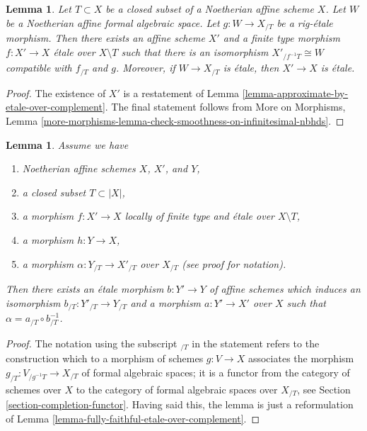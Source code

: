 \documentclass{stacks-project}
\theoremstyle{plain}
\newtheorem{lemma}[subsection]{Lemma}
\theoremstyle{definition}
\theoremstyle{remark}
\numberwithin{equation}{subsection}
\begin{document}
\begin{lemma}
\label{lemma-algebraize-rig-etale-affine}
Let $T \subset X$ be a closed subset of a Noetherian affine scheme $X$.
Let $W$ be a Noetherian affine formal algebraic space.
Let $g : W \to X_{/T}$ be a rig-\'etale morphism. Then there exists
an affine scheme $X'$ and a finite type morphism $f : X' \to X$
\'etale over $X \setminus T$ such that there is an isomorphism
$X'_{/f^{-1}T} \cong W$ compatible with $f_{/T}$ and $g$.
Moreover, if $W \to X_{/T}$ is \'etale, then $X' \to X$ is \'etale.
\end{lemma}

\begin{proof}
The existence of $X'$ is a restatement of
Lemma \ref{lemma-approximate-by-etale-over-complement}.
The final statement follows from
More on Morphisms, Lemma
\ref{more-morphisms-lemma-check-smoothness-on-infinitesimal-nbhds}.
\end{proof}

\begin{lemma}
\label{lemma-algebraize-morphism-rig-etale}
Assume we have
\begin{enumerate}
\item Noetherian affine schemes $X$, $X'$, and $Y$,
\item a closed subset $T \subset |X|$,
\item a morphism $f : X' \to X$ locally of finite type
and \'etale over $X \setminus T$,
\item a morphism $h : Y \to X$,
\item a morphism $\alpha : Y_{/T} \to X'_{/T}$ over $X_{/T}$
(see proof for notation).
\end{enumerate}
Then there exists an \'etale morphism $b : Y' \to Y$ of affine schemes
which induces an isomorphism $b_{/T} : Y'_{/T} \to Y_{/T}$
and a morphism $a : Y' \to X'$ over $X$
such that $\alpha = a_{/T} \circ b_{/T}^{-1}$.
\end{lemma}

\begin{proof}
The notation using the subscript ${}_{/T}$ in the statement
refers to the construction which to a morphism of schemes $g : V \to X$
associates the morphism $g_{/T} : V_{/g^{-1}T} \to X_{/T}$ of formal
algebraic spaces; it is a functor from the category of schemes over $X$
to the category of formal algebraic spaces over $X_{/T}$, see
Section \ref{section-completion-functor}.
Having said this, the lemma is just a reformulation of
Lemma \ref{lemma-fully-faithful-etale-over-complement}.
\end{proof}
\end{document}
